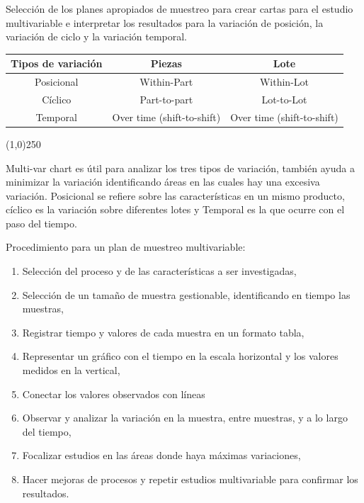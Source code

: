 \documentclass[]{article}
\begin{document}
Selección de los planes apropiados de muestreo para crear cartas para el estudio multivariable e interpretar los resultados para la variación de posición, la variación de ciclo y la variación temporal.
\begin{center}
\begin{tabular}{|c|c|c|}
	\hline Tipos de variación & Piezas & Lote \\ 
	\hline Posicional & Within-Part & Within-Lot \\ 
	\hline Cíclico & Part-to-part & Lot-to-Lot \\ 
	\hline Temporal & Over time (shift-to-shift) & Over time (shift-to-shift) \\ 
	\hline 
\end{tabular} 
\end{center}

\begin{center}
	\line(1,0){250}
\end{center}


Multi-var chart es útil para analizar los tres tipos de variación, también ayuda a minimizar la variación identificando áreas en las cuales hay una excesiva variación.
Posicional se refiere sobre las características en un mismo producto, cíclico es la variación sobre diferentes lotes y Temporal es la que ocurre con el paso del tiempo.


Procedimiento para un plan de muestreo multivariable:

\begin{enumerate}
	\item Selección del proceso y de las características a ser investigadas,
	\item Selección de un tamaño de muestra gestionable, identificando en tiempo las muestras,
	\item Registrar tiempo y valores de cada muestra en un formato tabla,
	\item Representar un gráfico con el tiempo en la escala horizontal y los valores medidos en la vertical,
	\item Conectar los valores observados con líneas
	\item Observar y analizar la variación en la muestra, entre muestras, y a lo largo del tiempo,
	\item Focalizar estudios en las áreas donde haya máximas variaciones,
	\item Hacer mejoras de procesos y repetir estudios multivariable para confirmar los resultados.
\end{enumerate}
\end{document}
